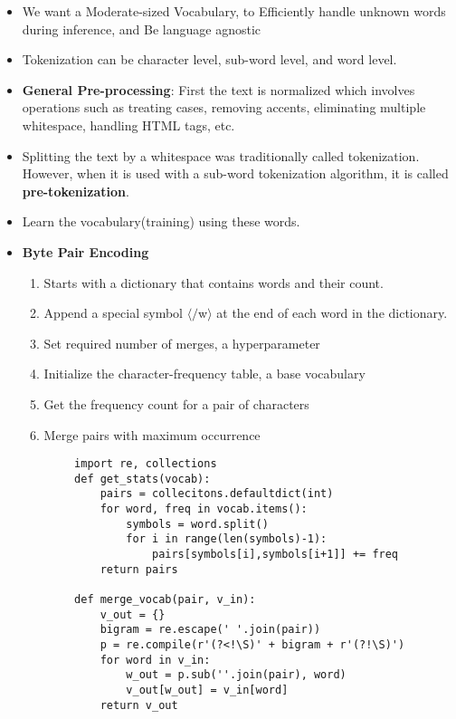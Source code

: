\documentclass[a4paper]{article}
\begin{document}
\begin{itemize}
\begin{enumerate}
    \end{enumerate}
    \item We want a Moderate-sized Vocabulary, to Efficiently handle unknown words during inference, and Be language agnostic
    \item Tokenization can be character level, sub-word level, and word level.
    \item \textbf{General Pre-processing}: First the text is normalized which involves operations such as treating cases, removing accents, eliminating multiple whitespace, handling HTML tags, etc.
    \item Splitting the text by a whitespace was traditionally called tokenization. However, when it is used with a sub-word tokenization algorithm, it is called \textbf{pre-tokenization}.
    \item Learn the vocabulary(training) using these words.
    \item \textbf{Byte Pair Encoding}
    \begin{enumerate}
        \item Starts with a dictionary that contains words and their count.
        \item Append a special symbol $\langle/$w$\rangle$ at the end of each word in the dictionary.
        \item Set required number of merges, a hyperparameter
        \item Initialize the character-frequency table, a base vocabulary
        \item Get the frequency count for a pair of characters
        \item Merge pairs with maximum occurrence
    \end{enumerate}
    \vspace{-1mm}
    \begin{verbatim}
        import re, collections
        def get_stats(vocab):
            pairs = collecitons.defaultdict(int)
            for word, freq in vocab.items():
                symbols = word.split()
                for i in range(len(symbols)-1):
                    pairs[symbols[i],symbols[i+1]] += freq
            return pairs

        def merge_vocab(pair, v_in):
            v_out = {}
            bigram = re.escape(' '.join(pair))
            p = re.compile(r'(?<!\S)' + bigram + r'(?!\S)')
            for word in v_in:
                w_out = p.sub(''.join(pair), word)
                v_out[w_out] = v_in[word]
            return v_out


\end{verbatim}
\end{itemize}
\end{document}
